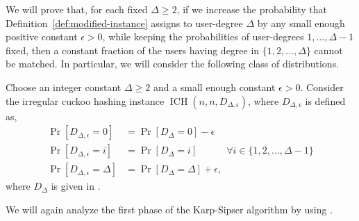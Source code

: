 \documentclass[11pt]{article}
\DeclareMathOperator*{\irregularcuckoohashing}{ICH}
\begin{document}
\smallskip

We will prove that, for each fixed $\Delta \ge 2$, if we increase the probability that Definition~\ref{def:modified-instance} assigns to user-degree $\Delta$  by any small enough positive constant $\epsilon > 0$, while keeping the probabilities of user-degrees $1,\ldots,\Delta-1$ fixed, then a constant fraction of the users having degree in $\{1,2,\ldots,\Delta\}$ cannot be matched. In particular, we will consider the following class of distributions.
\begin{definition}\label{def:eps-mass-instance}
Choose an integer constant $\Delta\geq 2$ and a small enough constant $\epsilon>0$. Consider the irregular cuckoo hashing instance $\irregularcuckoohashing(n,n,D_{\Delta,\epsilon})$, where $D_{\Delta,\epsilon}$ is defined as,
\begin{align*}
\Pr[D_{\Delta,\epsilon} = 0] &= \Pr[D_\Delta=0] - \epsilon\\
\Pr[D_{\Delta,\epsilon} = i] &= \Pr[D_\Delta=i] \quad\quad\quad \forall i \in \{1,2,\ldots,\Delta-1\}\\ 
\Pr[D_{\Delta,\epsilon} = \Delta] &= \Pr[D_\Delta=\Delta] + \epsilon,
\end{align*}
where $D_{\Delta}$ is given in .
\end{definition}

We will again analyze the first phase of the Karp-Sipser algorithm by using . 
\end{document}
